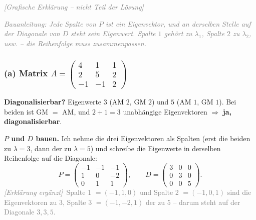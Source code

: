 \documentclass[a4paper,12pt]{article}
\newcommand{\grafik}{\textcolor{gray}{\small\textit{[Grafische Erkl\"arung -- nicht Teil der L\"osung]}}}
\newcommand{\erglerk}{\textcolor{gray}{\small\textit{[Erkl\"arung erg\"anzt]}}}
\newcommand{\EW}{Eigenwert}
\newcommand{\EV}{Eigenvektor}
\begin{document}
\grafik

\begin{center}
\end{center}

\textcolor{gray}{\small\textit{Bauanleitung: Jede Spalte von $P$ ist ein \EV{}, und an derselben Stelle auf der Diagonale von $D$ steht sein \EW{}. Spalte $1$ geh\"ort zu $\lambda_1$, Spalte $2$ zu $\lambda_2$, usw. -- die Reihenfolge muss zusammenpassen.}}

\subsubsection*{(a) Matrix $A = \left(\begin{smallmatrix} 4 & 1 & 1 \\ 2 & 5 & 2 \\ -1 & -1 & 2 \end{smallmatrix}\right)$}

\textbf{Diagonalisierbar?} Eigenwerte $3$ (AM $2$, GM $2$) und $5$ (AM $1$, GM $1$). Bei beiden ist GM $=$ AM, und $2 + 1 = 3$ unabh\"angige Eigenvektoren $\Rightarrow$ \textbf{ja, diagonalisierbar}.

\textbf{$P$ und $D$ bauen.} Ich nehme die drei Eigenvektoren als Spalten (erst die beiden zu $\lambda = 3$, dann der zu $\lambda = 5$) und schreibe die Eigenwerte in derselben Reihenfolge auf die Diagonale:
\[
P = \begin{pmatrix} -1 & -1 & -1 \\ 1 & 0 & -2 \\ 0 & 1 & 1 \end{pmatrix}, \qquad
D = \begin{pmatrix} 3 & 0 & 0 \\ 0 & 3 & 0 \\ 0 & 0 & 5 \end{pmatrix}.
\]
\erglerk\ \textcolor{gray}{\small Spalte 1 $=(-1,1,0)$ und Spalte 2 $=(-1,0,1)$ sind die \EV{}en zu $3$, Spalte 3 $=(-1,-2,1)$ der zu $5$ -- darum steht auf der Diagonale $3, 3, 5$.}
\end{document}
